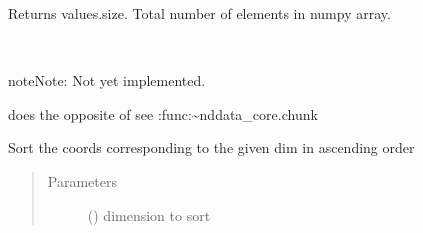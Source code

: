 \documentclass[letterpaper,10pt,english]{sphinxmanual}
\begin{document}
\begin{fulllineitems}

\begin{fulllineitems}
\label{\detokenize{dnpData:dnpLab.dnpdata.size}}
Returns values.size. Total number of elements in numpy array.

\end{fulllineitems}


\begin{fulllineitems}
\label{\detokenize{dnpData:dnpLab.dnpdata.smoosh}}~
\begin{sphinxadmonition}{note}{Note:}
Not yet implemented.
\end{sphinxadmonition}

 does the opposite of  \sphinxhyphen{}\sphinxhyphen{} see :func\textasciigrave{}:\textasciitilde{}nddata\_core.chunk\textasciigrave{}

\end{fulllineitems}


\begin{fulllineitems}
\label{\detokenize{dnpData:dnpLab.dnpdata.sort}}
Sort the coords corresponding to the given dim in ascending order
\begin{quote}\begin{description}
\item[{Parameters}] \leavevmode
{} () \sphinxhyphen{}\sphinxhyphen{} dimension to sort

\end{description}\end{quote}

\end{fulllineitems}



\end{fulllineitems}
\end{document}
